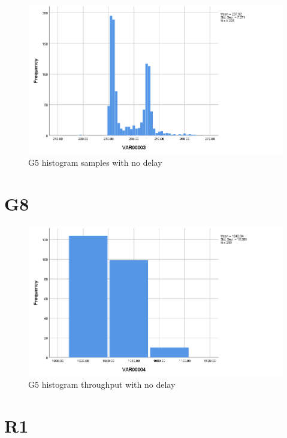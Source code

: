 \documentclass[hidelinks, 12pt, a4paper]{article}
\begin{document}
\begin{figure}[h!]
	\centering
		\includegraphics[height=.4\textheight, width=\textwidth]{assets/session1/g7.png}
		\caption{G5 histogram samples with no delay} 
	\end{figure}

\section{G8}

\begin{figure}[h!]
	\centering
		\includegraphics[height=.4\textheight, width=\textwidth]{assets/session1/g8.png}
		\caption{G5 histogram throughput with no delay} 
	\end{figure}

\section{R1}
\end{document}
